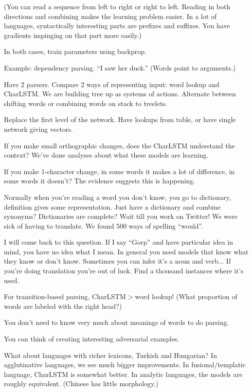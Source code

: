 (You can read a sequence from left to right or right to left. Reading in both directions and combining makes the learning problem easier. In a lot of languages, syntactically interesting parts are prefixes and suffixes. You have gradients impinging on that part more easily.)

In both cases, train parameters using backprop. 

Example: dependency parsing. ``I saw her duck.'' (Words point to arguments.) %

Have 2 parsers. Compare 2 ways of representing input: word lookup and CharLSTM. We are building tree up as systems of actions.
Alternate between shifting words or combining words on stack to treelets. 

Replace the first level of the network. Have lookups from table, or have single network giving vectors. 

If you make small orthographic changes, does the CharLSTM understand the context? We've done analyses about what these models are learning. 

If you make 1-character change, in some words it makes a lot of difference, in some words it doesn't? The evidence suggests this is happening.

%
Normally when you're reading a word you don't know, you go to dictionary, definition gives some representation. Just have a dictionary and combine synonyms? Dictionaries are complete? Wait till you work on Twitter! We were sick of having to translate. We found 500 ways of spelling ``would''. 

I will come back to this question. If I say ``Gorp'' and have particular idea in mind, you have no idea what I mean. In general you need models that know what they know or don't know. Sometimes you can infer it's a noun and verb... If you're doing translation you're out of luck. Find a thousand instances where it's used.


For transition-based parsing, CharLSTM$>$word lookup! (What proportion of words are labeled with the right head?)

You don't need to know very much about meanings of words to do parsing. 

You can think of creating interesting adversarial examples.

What about languages with richer lexicons, Turkish and Hungarian? In agglutinative languages, we see much bigger improvements. In fusional/templatic language, CharLSTM is somewhat better. In analytic languages, the models are roughly equivalent. (Chinese has little morphology.)

